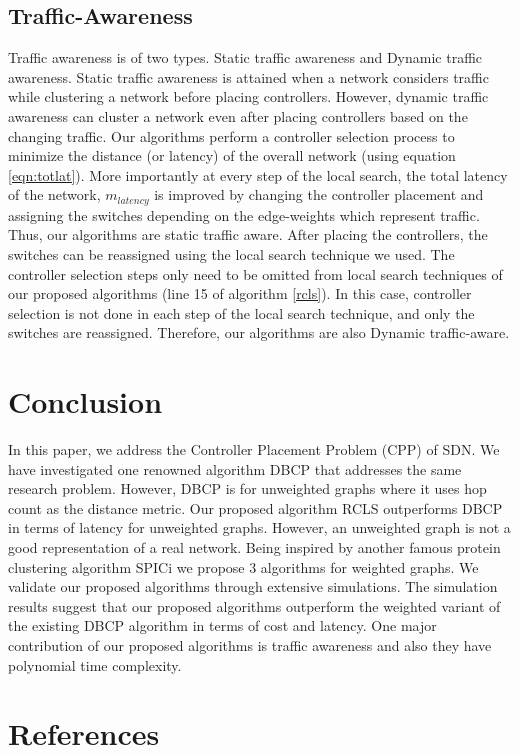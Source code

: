\documentclass[times]{dacauth}
\begin{document}
\subsection{Traffic-Awareness}

Traffic awareness is of two types. Static traffic awareness and Dynamic traffic awareness. Static traffic awareness is attained when a network considers traffic while clustering a network before placing controllers. However, dynamic traffic awareness can cluster a network even after placing controllers based on the changing traffic. Our algorithms perform a controller selection process to minimize the distance (or latency) of the overall network (using equation \ref{eqn:totlat}). More importantly at every step of the local search, the total latency of the network, $m_{latency}$ is improved by changing the controller placement and assigning the switches depending on the edge-weights which represent traffic. Thus, our algorithms are static traffic aware. After placing the controllers, the switches can be reassigned using the local search technique we used. The controller selection steps only need to be omitted from local search techniques of our proposed algorithms (line 15 of algorithm \ref{rcls}). In this case, controller selection is not done in each step of the local search technique, and only the switches are reassigned. Therefore, our algorithms are also Dynamic traffic-aware.

\section{Conclusion} \label {conclusion}
In this paper, we address the Controller Placement Problem (CPP) of SDN. We have investigated one renowned algorithm DBCP \cite{dbcp2017} that addresses the same research problem. However, DBCP is for unweighted graphs where it uses hop count as the distance metric. Our proposed algorithm RCLS outperforms DBCP in terms of latency for unweighted graphs. However, an unweighted graph is not a good representation of a real network. Being inspired by another famous protein clustering algorithm SPICi \cite{spici2010} we propose 3 algorithms for weighted graphs. We validate our proposed algorithms through extensive simulations. The simulation results suggest that our proposed algorithms outperform the weighted variant of the existing DBCP algorithm in terms of cost and latency. One major contribution of our proposed algorithms is traffic awareness and also they have polynomial time complexity.
\section*{References}



\end{document}
